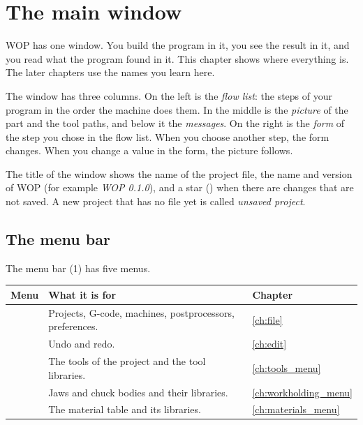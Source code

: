 \chapter{The main window}\label{ch:window}

WOP has one window. You build the program in it, you see the result in it, and you read what the program found in it. This chapter shows where everything is. The later chapters use the names you learn here.


The window has three columns. On the left is the \emph{flow list}: the steps of your program in the order the machine does them. In the middle is the \emph{picture} of the part and the tool paths, and below it the \emph{messages}. On the right is the \emph{form} of the step you chose in the flow list. When you choose another step, the form changes. When you change a value in the form, the picture follows.

The title of the window shows the name of the project file, the name and version of WOP (for example \emph{WOP 0.1.0}), and a star (\file{*}) when there are changes that are not saved. A new project that has no file yet is called \emph{unsaved project}.

\section{The menu bar}\label{sec:window:menus}

The menu bar (1) has five menus.

\begin{center}
\begin{tabularx}{\textwidth}{@{}l Y l@{}}
\toprule
\textbf{Menu} & \textbf{What it is for} & \textbf{Chapter} \\
\midrule
{} & Projects, G-code, machines, postprocessors, preferences. & \ref{ch:file} \\
 & Undo and redo. & \ref{ch:edit} \\
 & The tools of the project and the tool libraries. & \ref{ch:tools_menu} \\
 & Jaws and chuck bodies and their libraries. & \ref{ch:workholding_menu} \\
 & The material table and its libraries. & \ref{ch:materials_menu} \\
\bottomrule
\end{tabularx}
\end{center}

